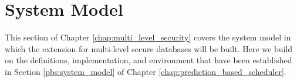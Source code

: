 \section{System Model}
\label{mls:system_model}

This section of Chapter \ref{chap:multi_level_security} covers the system model in which the extension for multi-level secure databases will be built. Here we build on the definitions, implementation, and environment that have been established in Section \ref{pbs:system_model} of Chapter \ref{chap:prediction_based_scheduler}.



% 
% 
% 